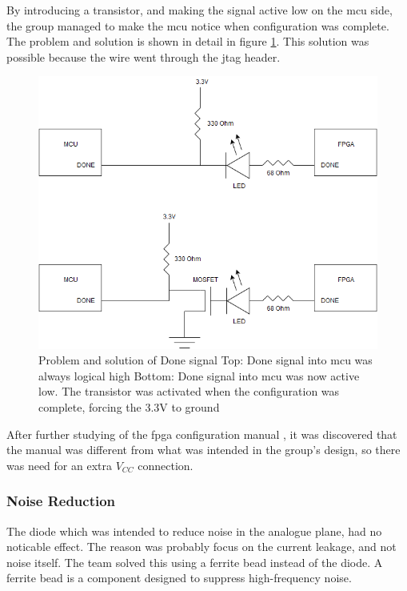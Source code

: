 By introducing a transistor, and making the signal active low on the \gls{mcu} side, the group managed to make the \gls{mcu} notice when configuration was complete.
The problem and solution is shown in detail in figure \ref{fig:Done Issue}.
This solution was possible because the wire went through the \gls{jtag} header.

\begin{figure}[h!]
\centering
\includegraphics[scale=0.5]{images/Done_Signal_Issue.png}
\caption{Problem and solution of Done signal
         \newline
         Top: Done signal into \gls{mcu} was always logical high
         \newline
         Bottom: Done signal into \gls{mcu} was now active low. The transistor was activated when the configuration was complete, forcing the 3.3V to ground}
\label{fig:Done Issue}
\end{figure}

After further studying of the \gls{fpga} configuration manual \cite[page 42]{fpga-configuration},
it was discovered that the manual was different from what was intended in the group's design,
so there was need for an extra \(V_{CC}\) connection.

\subsubsection{Noise Reduction}
The diode which was intended to reduce noise in the analogue plane, had no noticable effect.
The reason was probably focus on the current leakage, and not noise itself.
The team solved this using a ferrite bead instead of the diode.
A ferrite bead is a component designed to suppress high-frequency noise.

